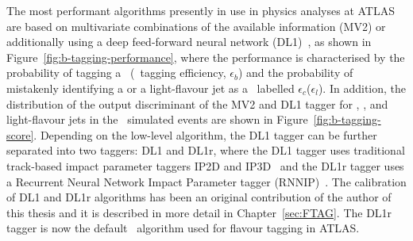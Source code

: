 The most performant algorithms presently in use in physics 
analyses at ATLAS are based on multivariate combinations 
of the available information (MV2) or additionally using a
deep feed-forward neural network (DL1)~\cite{tagging,ATL-PHYS-PUB-2017-013}, 
as shown in Figure~\ref{fig:b-tagging-performance}, where the performance
is characterised by the probability of 
tagging a \bjet\ (\bjet\ tagging efficiency, 
$\epsilon_b$) and the probability of mistakenly identifying 
a \cjet or a light-flavour jet as a \bjet\, 
labelled $\epsilon_c$($\epsilon_l$). 
In addition, the distribution of the output discriminant
of the MV2 and DL1 tagger for \bjet, \cjet, and light-flavour jets
in the \ttbar\ simulated events are shown in Figure~\ref{fig:b-tagging-score}.
Depending on the low-level algorithm, 
the DL1 tagger can be further separated into two taggers: DL1 and DL1r,
where the DL1 tagger uses traditional track-based impact parameter 
taggers IP2D and IP3D~\cite{ATL-PHYS-PUB-2016-012} 
and the DL1r tagger uses a Recurrent Neural Network Impact Parameter tagger 
(RNNIP)~\cite{ATL-PHYS-PUB-2017-013}. 
The calibration of DL1 and DL1r algorithms has been an original contribution 
of the author of this thesis and it is described in more detail in Chapter~\ref{sec:FTAG}.
The DL1r tagger is now the 
default \btagging\ algorithm used for flavour tagging in ATLAS.


